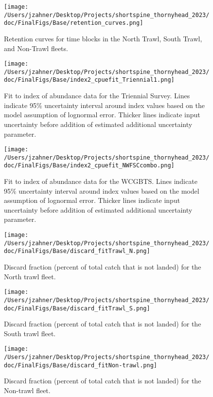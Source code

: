 \documentclass[11pt,
  english,
  letterpaper,
]{article}
\begin{document}
\begin{figure}
\centering
\texttt{[image: /Users/jzahner/Desktop/Projects/shortspine\_thornyhead\_2023/doc/FinalFigs/Base/retention\_curves.png]}
\caption{Retention curves for time blocks in the North Trawl, South Trawl, and Non-Trawl fleets.\label{fig:retblocks}}
\end{figure}

\begin{figure}
\centering
\texttt{[image: /Users/jzahner/Desktop/Projects/shortspine\_thornyhead\_2023/doc/FinalFigs/Base/index2\_cpuefit\_Triennial1.png]}
\caption{Fit to index of abundance data for the Triennial Survey. Lines indicate 95\% uncertainty interval around index values based on the model assumption of lognormal error. Thicker lines indicate input uncertainty before addition of estimated additional uncertainty parameter.\label{fig:fitsTri1}}
\end{figure}

\begin{figure}
\centering
\texttt{[image: /Users/jzahner/Desktop/Projects/shortspine\_thornyhead\_2023/doc/FinalFigs/Base/index2\_cpuefit\_NWFSCcombo.png]}
\caption{Fit to index of abundance data for the WCGBTS. Lines indicate 95\% uncertainty interval around index values based on the model assumption of lognormal error. Thicker lines indicate input uncertainty before addition of estimated additional uncertainty parameter.\label{fig:fitscombo}}
\end{figure}

\begin{figure}
\centering
\texttt{[image: /Users/jzahner/Desktop/Projects/shortspine\_thornyhead\_2023/doc/FinalFigs/Base/discard\_fitTrawl\_N.png]}
\caption{Discard fraction (percent of total catch that is not landed) for the North trawl fleet.\label{fig:northtrl_disc}}
\end{figure}

\begin{figure}
\centering
\texttt{[image: /Users/jzahner/Desktop/Projects/shortspine\_thornyhead\_2023/doc/FinalFigs/Base/discard\_fitTrawl\_S.png]}
\caption{Discard fraction (percent of total catch that is not landed) for the South trawl fleet.\label{fig:southtrl_disc}}
\end{figure}

\begin{figure}
\centering
\texttt{[image: /Users/jzahner/Desktop/Projects/shortspine\_thornyhead\_2023/doc/FinalFigs/Base/discard\_fitNon-trawl.png]}
\caption{Discard fraction (percent of total catch that is not landed) for the Non-trawl fleet.\label{fig:nontrl_disc}}
\end{figure}
\end{document}
